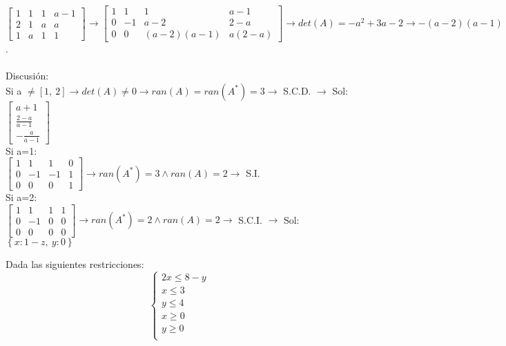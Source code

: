 \documentclass[addpoints,spanish, 12pt,a4paper]{exam}
\begin{document}
\begin{questions}
\begin{parts}
\end{parts}
\begin{solution}
$\left[\begin{matrix}1 & 1 & 1 & a - 1\\2 & 1 & a & a\\1 & a & 1 & 1\end{matrix}\right] \to \left[\begin{matrix}1 & 1 & 1 & a - 1\\0 & -1 & a - 2 & 2 - a\\0 & 0 & \left(a - 2\right) \left(a - 1\right) & a \left(2 - a\right)\end{matrix}\right]\to det(A)=- a^{2} + 3 a - 2\to- \left(a - 2\right) \left(a - 1\right)$. \\ \\ Discusión: \\Si a $\neq\left[ 1, \  2\right]\to det(A) \neq 0 \to ran(A)=ran(A^*)=3 \to $ S.C.D. $\to$ Sol:$\left[\begin{matrix}a + 1\\\frac{2 - a}{a - 1}\\- \frac{a}{a - 1}\end{matrix}\right]$ \\Si a=1: \\ $\left[\begin{matrix}1 & 1 & 1 & 0\\0 & -1 & -1 & 1\\0 & 0 & 0 & 1\end{matrix}\right] \to ran(A^*)=3 \land ran(A)=2 \to$  S.I. \\Si a=2: \\ $\left[\begin{matrix}1 & 1 & 1 & 1\\0 & -1 & 0 & 0\\0 & 0 & 0 & 0\end{matrix}\right] \to ran(A^*)=2 \land ran(A)=2 \to$  S.C.I.  $\to$ Sol:$\left\{ x : 1 - z, \  y : 0\right\}$
\end{solution}
\addpoints



\question Dada las siguientes restricciones: $$\left\{\begin{matrix}
2x  \leqslant  8 - y\\
x  \leqslant  3\\
y  \leqslant  4\\
x  \geqslant  0 \\
y  \geqslant  0 \\
\end{matrix}\right.$$ 


\end{questions}
\end{document}
